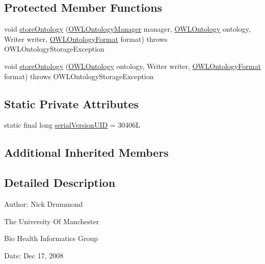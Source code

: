 \subsection*{Protected Member Functions}
\begin{DoxyCompactItemize}
\item 
void \hyperlink{classorg_1_1coode_1_1owlapi_1_1obo_1_1renderer_1_1_o_b_o_flat_file_ontology_storer_aa444e161a5f10cc5db2047904a43862f}{store\-Ontology} (\hyperlink{interfaceorg_1_1semanticweb_1_1owlapi_1_1model_1_1_o_w_l_ontology_manager}{O\-W\-L\-Ontology\-Manager} manager, \hyperlink{interfaceorg_1_1semanticweb_1_1owlapi_1_1model_1_1_o_w_l_ontology}{O\-W\-L\-Ontology} ontology, Writer writer, \hyperlink{classorg_1_1semanticweb_1_1owlapi_1_1model_1_1_o_w_l_ontology_format}{O\-W\-L\-Ontology\-Format} format)  throws O\-W\-L\-Ontology\-Storage\-Exception 
\item 
void \hyperlink{classorg_1_1coode_1_1owlapi_1_1obo_1_1renderer_1_1_o_b_o_flat_file_ontology_storer_aaa1bd6f56205e6b24786d9a96c89eced}{store\-Ontology} (\hyperlink{interfaceorg_1_1semanticweb_1_1owlapi_1_1model_1_1_o_w_l_ontology}{O\-W\-L\-Ontology} ontology, Writer writer, \hyperlink{classorg_1_1semanticweb_1_1owlapi_1_1model_1_1_o_w_l_ontology_format}{O\-W\-L\-Ontology\-Format} format)  throws O\-W\-L\-Ontology\-Storage\-Exception 
\end{DoxyCompactItemize}
\subsection*{Static Private Attributes}
\begin{DoxyCompactItemize}
\item 
static final long \hyperlink{classorg_1_1coode_1_1owlapi_1_1obo_1_1renderer_1_1_o_b_o_flat_file_ontology_storer_acd8315e0a40ffdf296867e1ec70dd85d}{serial\-Version\-U\-I\-D} = 30406\-L
\end{DoxyCompactItemize}
\subsection*{Additional Inherited Members}


\subsection{Detailed Description}
Author\-: Nick Drummond\par
 The University Of Manchester\par
 Bio Health Informatics Group\par
 Date\-: Dec 17, 2008\par
\par
 

